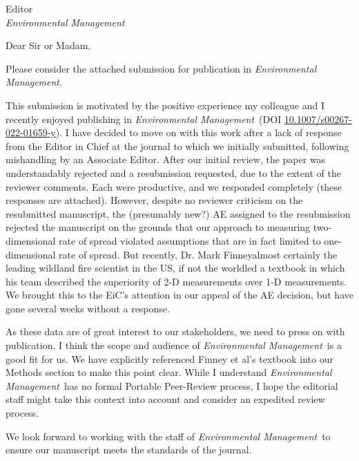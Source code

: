 \documentclass[parskip=half, 
			   fontsize=11pt,
			   paper=a4]				
{scrartcl}
\newcommand{\journal}{\emph{Environmental Management}}
\begin{document}
	\begin{letter}{Editor\\
		\journal }
\setlength{\parindent}{10pt}

\opening{Dear Sir or Madam,}  
		
Please consider the attached submission for publication in \journal. 

This submission is motivated by the positive experience my colleague and I recently enjoyed publishing in \journal~(DOI \href{https://doi.org/10.1007/s00267-022-01659-y}{10.1007/s00267-022-01659-y}). 
I have decided to move on with this work after a lack of response from the Editor in Chief at the journal to which we initially submitted, following mishandling by an Associate Editor. 
After our initial review, the paper was understandably rejected and a resubmission requested, due to the extent of the reviewer comments. 
Each were productive, and we responded completely (these responses are attached). 
However, despite no reviewer criticism on the resubmitted manuscript, the (presumably new?) AE assigned to the resubmission rejected the manuscript on the grounds that our approach to measuring two-dimensional rate of spread violated assumptions that are in fact limited to one-dimensional rate of spread. 
But recently, Dr. Mark Finney\textemdash almost certainly the leading wildland fire scientist in the US, if not the world\textemdash led a textbook in which his team described the superiority of 2-D measurements over 1-D measurements. 
We brought this to the EiC's attention in our appeal of the AE decision, but have gone several weeks without a response. 

As these data are of great interest to our stakeholders, we need to press on with publication. 
I think the scope and audience of \journal~is a good fit for us. 
We have explicitly referenced Finney et al's textbook into our Methods section to make this point clear. 
While I understand \journal~has no formal Portable Peer-Review process, I hope the editorial staff might take this context into account and consider an expedited review process. 

We look forward to working with the staff of \journal~to ensure our manuscript meets the standards of the journal. 

\vspace{-3em} 
\closing{} %
\end{letter}
\end{document}
